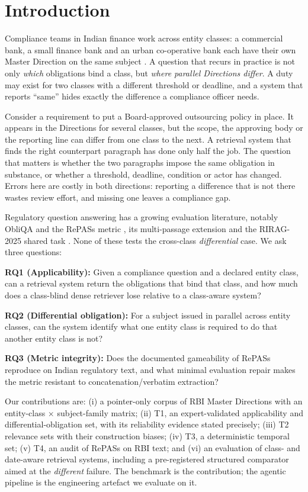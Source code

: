 \documentclass[conference]{IEEEtran}
\begin{document}
\section{Introduction}\label{sec:intro}
Compliance teams in Indian finance work across entity classes: a commercial bank, a small finance bank and an urban co-operative
bank each have their own Master Direction on the same subject \cite{rbi}. A question that recurs in practice is not only
\emph{which} obligations bind a class, but \emph{where parallel Directions differ}. A duty may exist for two classes with a
different threshold or deadline, and a system that reports ``same'' hides exactly the difference a compliance officer needs.

Consider a requirement to put a Board-approved outsourcing policy in place. It appears in the Directions for several classes, but
the scope, the approving body or the reporting line can differ from one class to the next. A retrieval system that finds the
right counterpart paragraph has done only half the job. The question that matters is whether the two paragraphs impose the same
obligation in substance, or whether a threshold, deadline, condition or actor has changed. Errors here are costly in both
directions: reporting a difference that is not there wastes review effort, and missing one leaves a compliance gap.

Regulatory question answering has a growing evaluation literature, notably ObliQA and the RePASs metric \cite{gokhan2024regnlp},
its multi-passage extension \cite{obliqamp} and the RIRAG-2025 shared task \cite{gokhan2025riragtask}. None of these tests
the cross-class \emph{differential} case. We ask three questions:

\textbf{RQ1 (Applicability):} Given a compliance question and a declared entity class, can a retrieval system return the
obligations that bind that class, and how much does a class-blind dense retriever lose relative to a class-aware system?

\textbf{RQ2 (Differential obligation):} For a subject issued in parallel across entity classes, can the system identify what
one entity class is required to do that another entity class is not?

\textbf{RQ3 (Metric integrity):} Does the documented gameability of RePASs reproduce on Indian regulatory text, and what minimal
evaluation repair makes the metric resistant to concatenation/verbatim extraction?

Our contributions are: (i) a pointer-only corpus of RBI Master Directions with an entity-class $\times$ subject-family matrix;
(ii) T1, an expert-validated applicability and differential-obligation set, with its reliability evidence stated precisely;
(iii) T2 relevance sets with their construction biases; (iv) T3, a deterministic temporal set; (v) T4, an audit of RePASs on
RBI text; and (vi) an evaluation of class- and date-aware retrieval systems, including a pre-registered structured comparator
aimed at the \textit{different} failure. The benchmark is the contribution; the agentic pipeline is the engineering artefact we
evaluate on it.
\end{document}
